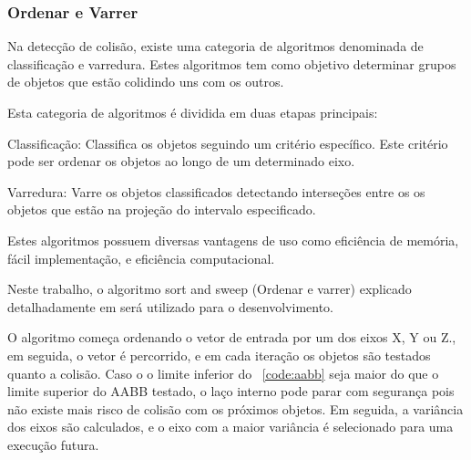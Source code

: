 \subsubsection{Ordenar e Varrer}

Na detecção de colisão, existe uma categoria de algoritmos denominada de
classificação e varredura. Estes algoritmos tem como objetivo determinar grupos
de objetos que estão colidindo uns com os outros.

Esta categoria de algoritmos é dividida em duas etapas principais:

Classificação: Classifica os objetos seguindo um critério específico. Este
critério pode ser ordenar os objetos ao longo de um determinado eixo.

Varredura: Varre os objetos classificados detectando interseções entre os os
objetos que estão na projeção do intervalo especificado.

Estes algoritmos possuem diversas vantagens de uso como eficiência de memória,
fácil implementação, e eficiência computacional.

Neste trabalho, o algoritmo sort and sweep (Ordenar e varrer) explicado
detalhadamente em  será utilizado para o desenvolvimento.

O algoritmo começa ordenando o vetor de entrada por um dos eixos X, Y ou Z., em
seguida, o vetor é percorrido, e em cada iteração os objetos são testados
quanto a colisão. Caso o o limite inferior do ~\ref{code:aabb} seja maior do
que o limite superior do AABB testado, o laço interno pode parar com segurança
pois não existe mais risco de colisão com os próximos objetos. Em seguida, a
variância dos eixos são calculados, e o eixo com a maior variância é
selecionado para uma execução futura.

